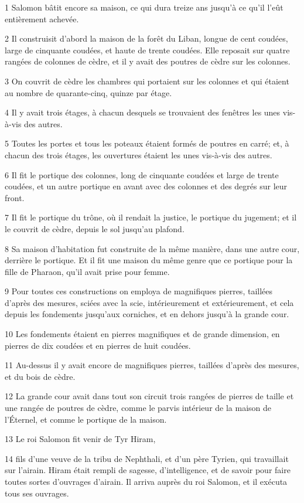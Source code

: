 \par 1 Salomon bâtit encore sa maison, ce qui dura treize ans jusqu'à ce qu'il l'eût entièrement achevée.
\par 2 Il construisit d'abord la maison de la forêt du Liban, longue de cent coudées, large de cinquante coudées, et haute de trente coudées. Elle reposait sur quatre rangées de colonnes de cèdre, et il y avait des poutres de cèdre sur les colonnes.
\par 3 On couvrit de cèdre les chambres qui portaient sur les colonnes et qui étaient au nombre de quarante-cinq, quinze par étage.
\par 4 Il y avait trois étages, à chacun desquels se trouvaient des fenêtres les unes vis-à-vis des autres.
\par 5 Toutes les portes et tous les poteaux étaient formés de poutres en carré; et, à chacun des trois étages, les ouvertures étaient les unes vis-à-vis des autres.
\par 6 Il fit le portique des colonnes, long de cinquante coudées et large de trente coudées, et un autre portique en avant avec des colonnes et des degrés sur leur front.
\par 7 Il fit le portique du trône, où il rendait la justice, le portique du jugement; et il le couvrit de cèdre, depuis le sol jusqu'au plafond.
\par 8 Sa maison d'habitation fut construite de la même manière, dans une autre cour, derrière le portique. Et il fit une maison du même genre que ce portique pour la fille de Pharaon, qu'il avait prise pour femme.
\par 9 Pour toutes ces constructions on employa de magnifiques pierres, taillées d'après des mesures, sciées avec la scie, intérieurement et extérieurement, et cela depuis les fondements jusqu'aux corniches, et en dehors jusqu'à la grande cour.
\par 10 Les fondements étaient en pierres magnifiques et de grande dimension, en pierres de dix coudées et en pierres de huit coudées.
\par 11 Au-dessus il y avait encore de magnifiques pierres, taillées d'après des mesures, et du bois de cèdre.
\par 12 La grande cour avait dans tout son circuit trois rangées de pierres de taille et une rangée de poutres de cèdre, comme le parvis intérieur de la maison de l'Éternel, et comme le portique de la maison.
\par 13 Le roi Salomon fit venir de Tyr Hiram,
\par 14 fils d'une veuve de la tribu de Nephthali, et d'un père Tyrien, qui travaillait sur l'airain. Hiram était rempli de sagesse, d'intelligence, et de savoir pour faire toutes sortes d'ouvrages d'airain. Il arriva auprès du roi Salomon, et il exécuta tous ses ouvrages.
